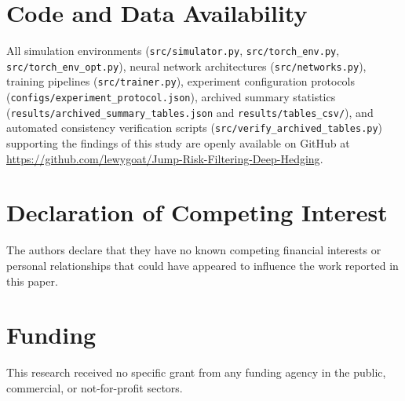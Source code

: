 \documentclass[11pt,a4paper]{article}
\begin{document}
\section*{Code and Data Availability}
All simulation environments (\texttt{src/simulator.py}, \texttt{src/torch\_env.py}, \texttt{src/torch\_env\_opt.py}), neural network architectures (\texttt{src/networks.py}), training pipelines (\texttt{src/trainer.py}), experiment configuration protocols (\texttt{configs/experiment\_protocol.json}), archived summary statistics (\texttt{results/archived\_summary\_tables.json} and \texttt{results/tables\_csv/}), and automated consistency verification scripts (\texttt{src/verify\_archived\_tables.py}) supporting the findings of this study are openly available on GitHub at \url{https://github.com/lewygoat/Jump-Risk-Filtering-Deep-Hedging}.

\section*{Declaration of Competing Interest}
The authors declare that they have no known competing financial interests or personal relationships that could have appeared to influence the work reported in this paper.

\section*{Funding}
This research received no specific grant from any funding agency in the public, commercial, or not-for-profit sectors.
\end{document}
